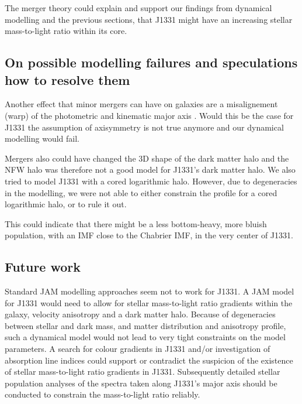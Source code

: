 The merger theory could explain and support our findings from dynamical modelling and the previous sections, that J1331 might have an increasing stellar mass-to-light ratio within its core. 

\subsection{On possible modelling failures and speculations how to resolve them}


Another effect that minor mergers can have on galaxies are a misalignement (warp) of the photometric and kinematic major axis \Wilma{[TO DO: REF]}. Would this be the case for J1331 the assumption of axisymmetry is not true anymore and our dynamical modelling would fail.

Mergers also could have changed the 3D shape of the dark matter halo and the NFW halo was therefore not a good model for J1331's dark matter halo. We also tried to model J1331 with a cored logarithmic halo. However, due to degeneracies in the modelling, we were not able to either constrain the profile for a cored logarithmic halo, or to rule it out. 


This could indicate that there might be a less bottom-heavy, more bluish population, with an IMF close to the Chabrier IMF, in the very center of J1331.

\subsection{Future work}

Standard JAM modelling approaches seem not to work for J1331. A JAM model for J1331 would need to allow for stellar mass-to-light ratio gradients within the galaxy, velocity anisotropy and a dark matter halo. Because of degeneracies between stellar and dark mass, and matter distribution and anisotropy profile, such a dynamical model would not lead to very tight constraints on the model parameters.  A search for colour gradients in J1331 and/or investigation of absorption line indices could support or contradict the suspicion of the existence of stellar mass-to-light ratio gradients in J1331. Subsequently detailed stellar population analyses of the spectra taken along J1331's major axis should be conducted to constrain the mass-to-light ratio reliably.  

